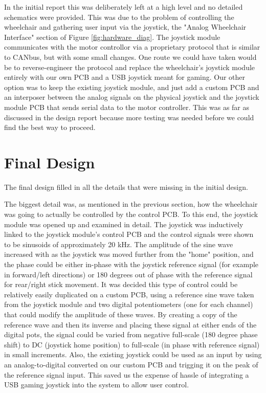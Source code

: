 \documentclass[oneside,final,a4paper]{report}
\begin{document}
In the initial report this was deliberately left at a high level and no detailed schematics were provided. This was due to the problem of controlling the wheelchair and gathering user input via the joystick, the "Analog Wheelchair Interface" section of Figure \ref{fig:hardware_diag}. The joystick module communicates with the motor controllor via a proprietary protocol that is similar to CANbus, but with some small changes. One route we could have taken would be to reverse-engineer the protocol and replace the wheelchair's joystick module entirely with our own PCB and a USB joystick meant for gaming. Our other option was to keep the existing joystick module, and just add a custom PCB and an interposer between the analog signals on the physical joystick and the joystick module PCB that sends serial data to the motor controller. This was as far as discussed in the design report because more testing was needed before we could find the best way to proceed.

\section{Final Design}
The final design filled in all the details that were missing in the initial design. 

The biggest detail was, as mentioned in the previous section, how the wheelchair was going to actually be controlled by the control PCB. To this end, the joystick module was opened up and examined in detail. The joystick was inductively linked to the joystick module's control PCB and the control signals were shown to be sinusoids of approximately 20 kHz. The amplitude of the sine wave increased with as the joystick was moved further from the "home" position, and the phase could be either in-phase with the joystick reference signal (for example in forward/left directions) or 180 degrees out of phase with the reference signal for rear/right stick movement. It was decided this type of control could be relatively easily duplicated on a custom PCB, using a reference sine wave taken from the joystick module and two digital potentiometers (one for each channel) that could modify the amplitude of these waves. By creating a copy of the reference wave and then its inverse and placing these signal at either ends of the digital pots, the signal could be varied from negative full-scale (180 degree phase shift) to DC (joystick home position) to full-scale (in phase with reference signal) in small increments. Also, the existing joystick could be used as an input by using an analog-to-digital converted on our custom PCB and trigging it on the peak of the reference signal input. This saved us the expense of hassle of integrating a USB gaming joystick into the system to allow user control.
\end{document}
